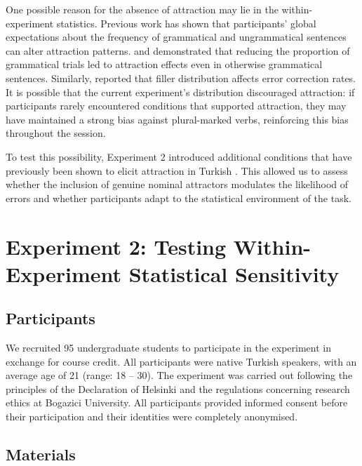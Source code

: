 \documentclass[
  authoryear,
  3p]{elsarticle}
\begin{document}
One possible reason for the absence of attraction may lie in the
within-experiment statistics. Previous work has shown that participants'
global expectations about the frequency of grammatical and ungrammatical
sentences can alter attraction patterns. \citet{HammerlyEtAl2019} and
\citet{Turk2022} demonstrated that reducing the proportion of
grammatical trials led to attraction effects even in otherwise
grammatical sentences. Similarly, \citet{ArehalliWittenberg2021}
reported that filler distribution affects error correction rates. It is
possible that the current experiment's distribution discouraged
attraction: if participants rarely encountered conditions that supported
attraction, they may have maintained a strong bias against plural-marked
verbs, reinforcing this bias throughout the session.

To test this possibility, Experiment 2 introduced additional conditions
that have previously been shown to elicit attraction in Turkish
\citep{TurkLogacev2024, LagoEtAl2019}. This allowed us to assess whether
the inclusion of genuine nominal attractors modulates the likelihood of
errors and whether participants adapt to the statistical environment of
the task.

\section{Experiment 2: Testing Within-Experiment Statistical
Sensitivity}\label{experiment-2-testing-within-experiment-statistical-sensitivity}

\subsection{Participants}\label{participants-1}

We recruited 95 undergraduate students to participate in the experiment
in exchange for course credit. All participants were native Turkish
speakers, with an average age of 21 (range: 18 -- 30). The experiment
was carried out following the principles of the Declaration of Helsinki
and the regulations concerning research ethics at Bogazici University.
All participants provided informed consent before their participation
and their identities were completely anonymised.

\subsection{Materials}\label{materials-1}
\end{document}
